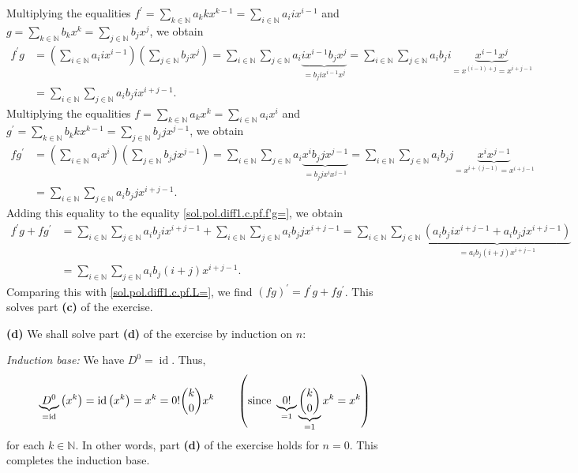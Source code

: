 \documentclass[paper=a4, fontsize=12pt]{scrartcl}%
\let\sumnonlimits\sum
\renewcommand{\sum}{\sumnonlimits\limits}
\theoremstyle{plainsl}
\theoremstyle{definition}
\theoremstyle{remark}
\begin{document}
Multiplying the equalities $f^{\prime}=\sum_{k\in\mathbb{N}}a_{k}kx^{k-1}%
=\sum_{i\in\mathbb{N}}a_{i}ix^{i-1}$ and $g=\sum_{k\in\mathbb{N}}b_{k}%
x^{k}=\sum_{j\in\mathbb{N}}b_{j}x^{j}$, we obtain%
\begin{align}
f^{\prime}g  &  =\left(  \sum_{i\in\mathbb{N}}a_{i}ix^{i-1}\right)  \left(
\sum_{j\in\mathbb{N}}b_{j}x^{j}\right)  =\sum_{i\in\mathbb{N}}\sum
_{j\in\mathbb{N}}a_{i}\underbrace{ix^{i-1}b_{j}x^{j}}_{=b_{j}ix^{i-1}x^{j}%
}=\sum_{i\in\mathbb{N}}\sum_{j\in\mathbb{N}}a_{i}b_{j}i\underbrace{x^{i-1}%
x^{j}}_{=x^{\left(  i-1\right)  +j}=x^{i+j-1}}\nonumber\\
&  =\sum_{i\in\mathbb{N}}\sum_{j\in\mathbb{N}}a_{i}b_{j}ix^{i+j-1}.
\label{sol.pol.diff1.c.pf.f'g=}%
\end{align}
Multiplying the equalities $f=\sum_{k\in\mathbb{N}}a_{k}x^{k}=\sum
_{i\in\mathbb{N}}a_{i}x^{i}$ and $g^{\prime}=\sum_{k\in\mathbb{N}}%
b_{k}kx^{k-1}=\sum_{j\in\mathbb{N}}b_{j}jx^{j-1}$, we obtain%
\begin{align*}
fg^{\prime}  &  =\left(  \sum_{i\in\mathbb{N}}a_{i}x^{i}\right)  \left(
\sum_{j\in\mathbb{N}}b_{j}jx^{j-1}\right)  =\sum_{i\in\mathbb{N}}\sum
_{j\in\mathbb{N}}a_{i}\underbrace{x^{i}b_{j}jx^{j-1}}_{=b_{j}jx^{i}x^{j-1}%
}=\sum_{i\in\mathbb{N}}\sum_{j\in\mathbb{N}}a_{i}b_{j}j\underbrace{x^{i}%
x^{j-1}}_{=x^{i+\left(  j-1\right)  }=x^{i+j-1}}\\
&  =\sum_{i\in\mathbb{N}}\sum_{j\in\mathbb{N}}a_{i}b_{j}jx^{i+j-1}.
\end{align*}
Adding this equality to the equality \eqref{sol.pol.diff1.c.pf.f'g=}, we
obtain%
\begin{align*}
f^{\prime}g+fg^{\prime}  &  =\sum_{i\in\mathbb{N}}\sum_{j\in\mathbb{N}}%
a_{i}b_{j}ix^{i+j-1}+\sum_{i\in\mathbb{N}}\sum_{j\in\mathbb{N}}a_{i}%
b_{j}jx^{i+j-1}=\sum_{i\in\mathbb{N}}\sum_{j\in\mathbb{N}}\underbrace{\left(
a_{i}b_{j}ix^{i+j-1}+a_{i}b_{j}jx^{i+j-1}\right)  }_{=a_{i}b_{j}\left(
i+j\right)  x^{i+j-1}}\\
&  =\sum_{i\in\mathbb{N}}\sum_{j\in\mathbb{N}}a_{i}b_{j}\left(  i+j\right)
x^{i+j-1}.
\end{align*}
Comparing this with \eqref{sol.pol.diff1.c.pf.L=}, we find $\left(  fg\right)
^{\prime}=f^{\prime}g+fg^{\prime}$. This solves part \textbf{(c)} of the exercise.

\bigskip

\textbf{(d)} We shall solve part \textbf{(d)} of the exercise by induction on
$n$:

\textit{Induction base:} We have $D^{0}=\operatorname*{id}$. Thus,
\[
\underbrace{D^{0}}_{=\operatorname*{id}}\left(  x^{k}\right)
=\operatorname*{id}\left(  x^{k}\right)  =x^{k}=0!\dbinom{k}{0}x^{k}%
\qquad\left(  \text{since }\underbrace{0!}_{=1}\underbrace{\dbinom{k}{0}}%
_{=1}x^{k}=x^{k}\right)
\]
for each $k\in\mathbb{N}$. In other words, part \textbf{(d)} of the exercise
holds for $n=0$. This completes the induction base.
\end{document}
